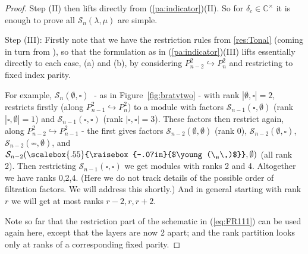 \documentclass[reqno,10pt,a4paper]{amsart}
\newcommand{\C}{\mathbb{C}}
\DeclareMathOperator{\Ind}{Ind}
\newcommand{\rb}[2]{\raisebox{#1}{#2}}
\newcommand{\blue}[1]{\textcolor{blue}{#1}}
\newcommand{\ppmm}[1]{{#1}}
\newcommand{\ca}[1]{\blue{#1}}
\newcommand{\cell}{\mathcal{S}}
\newcommand{\SSS}{\mathcal{S}} %
\begin{document}
\begin{proof}
{\newcommand{\boxx}{\square}

\noindent
Step (II) then lifts directly
from (\ref{pa:indicator})(II). 
So for $\delta_c \in \C^\times$ it is enough to prove all $\SSS_n(\lambda,\mu)$ are simple. 

\noindent 
Step (III):
Firstly note that 
we have the restriction rules from \ref{res:Tonal}
(coming in turn from \cite[\S11.1]{amm2019tonal}), 
so that the formulation as in 
(\ref{pa:indicator})(III) lifts essentially directly
\ppmm{to each case, 
(a) and (b), 
by considering $P^2_{n-2} \hookrightarrow P^2_n$ and restricting to fixed index parity.}

\ppmm{ 
For example, $\SSS_n(\emptyset,\boxx) \;$ - as in Figure~\ref{fig:bratvtwo} - 
with rank $| \emptyset,\boxx | = 2$,
restricts firstly (along $P^2_{n-1} \hookrightarrow P^2_n$) 
to a module with 
factors $\SSS_{n-1}(\boxx,\emptyset)$ 
(rank $| \boxx,\emptyset  | = 1$) and 
$\SSS_{n-1}(\boxx,\boxx)$
(rank $| \boxx,\boxx  | = 3$).
These factors then restrict again, 
along   $P^2_{n-2} \hookrightarrow P^2_{n-1}$
- the first gives factors 
$\SSS_{n-2}(\emptyset,\emptyset)$
(rank 0),
$\SSS_{n-2}(\emptyset,\boxx)$,
$\SSS_{n-2}(\boxx\!\boxx , \emptyset)$,
and 
$\SSS_{n-2}( %
{{\scalebox{.55}{\rb{-.07in}{$\young(\,,\,)$}}}}
, \emptyset)$
(all rank 2).
Then restricting  $\SSS_{n-1}(\boxx,\boxx)$ we get 
modules with ranks 2 and 4. 
Altogether we have ranks 0,2,4.
(Here we do not track details of the possible order of filtration factors. We will address this shortly.)
And in general starting with rank $r$ we will get 
at most ranks $r-2,r,r+2$. 
 }

\ppmm{Note so far that the restriction part of the schematic in (\ref{eq:FR111})
can be used again here, except that the layers are now 2 apart; and the rank partition looks only at ranks of a corresponding fixed parity.}

\newcommand{\Indd}[2]{\Ind^{#1}_{#2}}

}
\end{proof}
\end{document}
